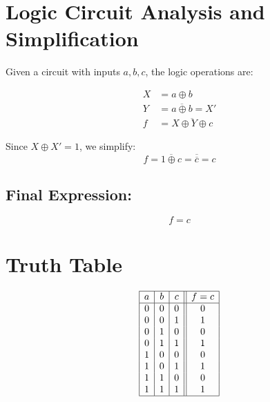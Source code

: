 \documentclass[12pt]{article}
\begin{document}
\Large

\section*{Logic Circuit Analysis and Simplification}

Given a circuit with inputs \(a, b, c\), the logic operations are:

\begin{align*}
X &= a \oplus b \\
Y &= \overline{a \oplus b} = X' \\
f &= \overline{X \oplus Y \oplus c}
\end{align*}

Since \(X \oplus X' = 1\), we simplify:
\[
f = \overline{1 \oplus c} = \overline{\overline{c}} = c
\]

\subsection*{Final Expression:}
\[
\boxed{f = c}
\]

\bigskip

\section*{Truth Table}

\[
\begin{array}{|c|c|c||c|}
\hline
a & b & c & f = c \\
\hline
0 & 0 & 0 & 0 \\
0 & 0 & 1 & 1 \\
0 & 1 & 0 & 0 \\
0 & 1 & 1 & 1 \\
1 & 0 & 0 & 0 \\
1 & 0 & 1 & 1 \\
1 & 1 & 0 & 0 \\
1 & 1 & 1 & 1 \\
\hline
\end{array}
\]
\end{document}
